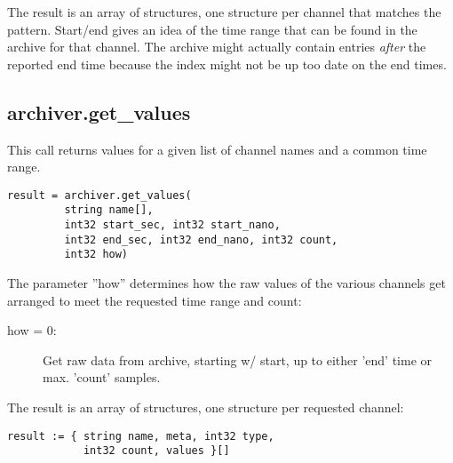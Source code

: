 The result is an array of structures, one structure
per channel that matches the pattern.
Start/end gives an idea of the time range that can
be found in the archive for that channel.
The archive might actually contain entries \emph{after}
the reported end time because the index might not
be up too date on the end times.

\subsection{archiver.get\_values}
This call returns values for a given list of channel names
and a common time range.

\begin{lstlisting}[keywordstyle=\sffamily]
result = archiver.get_values(
         string name[],
         int32 start_sec, int32 start_nano,
         int32 end_sec, int32 end_nano, int32 count,
         int32 how)
\end{lstlisting}

The parameter ''how'' determines how the raw values of the various
channels get arranged to meet the requested time range and count:
\begin{description}
\item[\sffamily how = 0:]
  Get raw data from archive, starting w/ start,
  up to either 'end' time or max. 'count' samples.
\end{description}

\noindent The result is an array of structures, one structure per
requested channel:

\begin{lstlisting}[keywordstyle=\sffamily]
result := { string name, meta, int32 type,
            int32 count, values }[]
\end{lstlisting}

